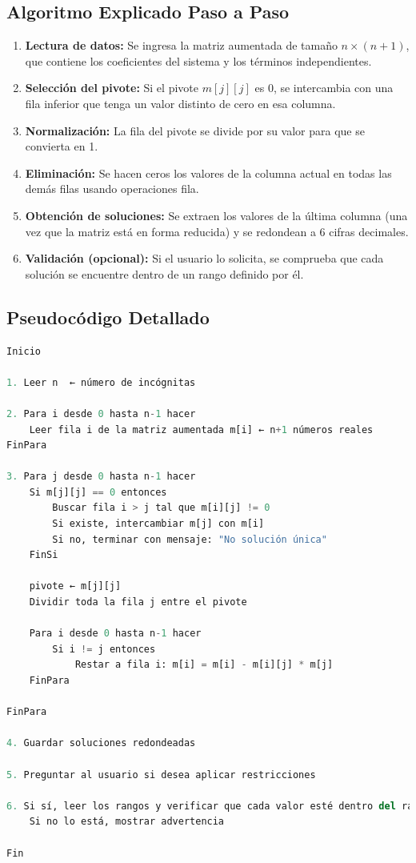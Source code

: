 \documentclass[a4paper,10pt]{article}
\begin{document}
\subsection{Algoritmo Explicado Paso a Paso}
\begin{enumerate}
    \item \textbf{Lectura de datos:} Se ingresa la matriz aumentada de tamaño $n \times (n+1)$, que contiene los coeficientes del sistema y los términos independientes.
    \item \textbf{Selección del pivote:} Si el pivote $m[j][j]$ es 0, se intercambia con una fila inferior que tenga un valor distinto de cero en esa columna.
    \item \textbf{Normalización:} La fila del pivote se divide por su valor para que se convierta en 1.
    \item \textbf{Eliminación:} Se hacen ceros los valores de la columna actual en todas las demás filas usando operaciones fila.
    \item \textbf{Obtención de soluciones:} Se extraen los valores de la última columna (una vez que la matriz está en forma reducida) y se redondean a 6 cifras decimales.
    \item \textbf{Validación (opcional):} Si el usuario lo solicita, se comprueba que cada solución se encuentre dentro de un rango definido por él.
\end{enumerate}

\subsection{Pseudocódigo Detallado}

\begin{lstlisting}[language=Python, caption={Pseudocódigo del algoritmo Gauss-Jordan}]
Inicio

1. Leer n  ← número de incógnitas

2. Para i desde 0 hasta n-1 hacer
    Leer fila i de la matriz aumentada m[i] ← n+1 números reales
FinPara

3. Para j desde 0 hasta n-1 hacer
    Si m[j][j] == 0 entonces
        Buscar fila i > j tal que m[i][j] != 0
        Si existe, intercambiar m[j] con m[i]
        Si no, terminar con mensaje: "No solución única"
    FinSi

    pivote ← m[j][j]
    Dividir toda la fila j entre el pivote

    Para i desde 0 hasta n-1 hacer
        Si i != j entonces
            Restar a fila i: m[i] = m[i] - m[i][j] * m[j]
    FinPara

FinPara

4. Guardar soluciones redondeadas

5. Preguntar al usuario si desea aplicar restricciones

6. Si sí, leer los rangos y verificar que cada valor esté dentro del rango
    Si no lo está, mostrar advertencia

Fin
\end{lstlisting}
\end{document}
